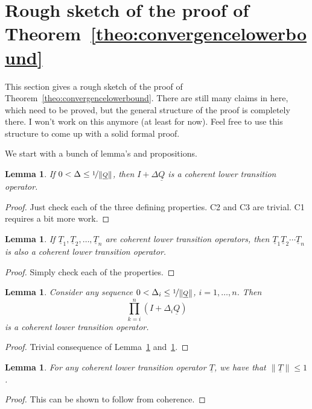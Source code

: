 \documentclass[a4paper,reqno]{amsart}
\newtheorem{lemma}[theorem]{Lemma}
\newcommand{\lt}{\underline{T}}
\newcommand{\lrate}{\underline{Q}}
\newcommand{\norm}[1]{\left\lVert #1 \right\rVert}
\begin{document}
\section{Rough sketch of the proof of Theorem~\ref{theo:convergencelowerbound}}\label{sec:proofsketch}

This section gives a rough sketch of the proof of Theorem~\ref{theo:convergencelowerbound}. There are still many claims in here, which need to be proved, but the general structure of the proof is completely there. I won't work on this anymore (at least for now). Feel free to use this structure to come up with a solid formal proof. 


We start with a bunch of lemma's and propositions.

\begin{lemma}\label{lemma:normQsmallenough}
If $0<\Delta\leq\nicefrac{1}{\norm{\lrate}}$, then $I+\Delta\lrate$ is a coherent lower transition operator.
\end{lemma}
\begin{proof}
Just check each of the three defining properties. C2 and C3 are trivial. C1 requires a bit more work.
\end{proof}

\begin{lemma}\label{lemma:compositioncoherence}
If $\lt_1,\lt_2,\dots,\lt_n$ are coherent lower transition operators, then  $\lt_1\lt_2\cdots\lt_n$ is also a coherent lower transition operator.
\end{lemma}
\begin{proof}
Simply check each of the properties.
\end{proof}

\begin{lemma}\label{lemma:productiscoherent}
Consider any sequence $0<\Delta_i\leq\nicefrac{1}{\norm{\lrate}}$, $i=1,\dots,n$. Then
\begin{equation*}
\prod_{k=i}^n(I+\Delta_i\lrate)
\end{equation*}
is a coherent lower transition operator.
\end{lemma}
\begin{proof}
Trivial consequence of Lemma~\ref{lemma:normQsmallenough} and~\ref{lemma:compositioncoherence}.
\end{proof}

\begin{lemma}\label{lemma:normofcoherenttrans}
For any coherent lower transition operator $\lt$, we have that $\norm{\lt}\leq 1$.
\end{lemma}
\begin{proof}
This can be shown to follow from coherence.
\end{proof}
\end{document}
